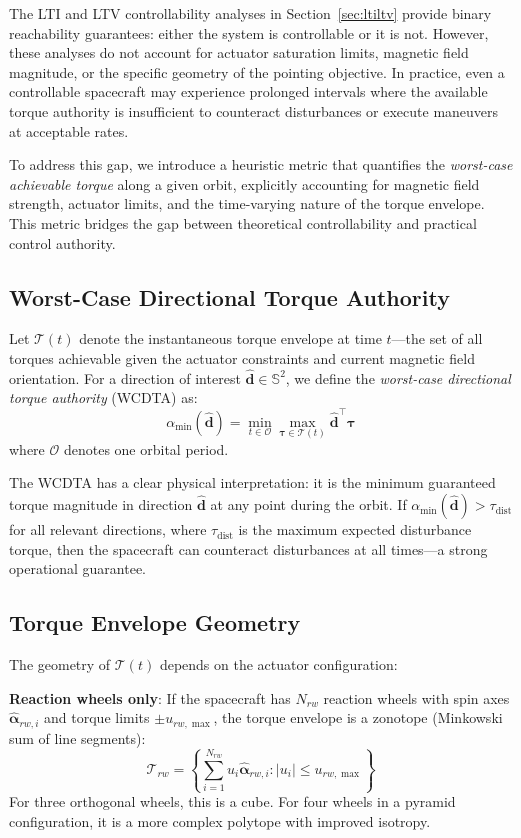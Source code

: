 \documentclass[conference]{IEEEtran}
\begin{document}
The LTI and LTV controllability analyses in Section~\ref{sec:ltiltv} provide binary reachability guarantees: either the system is controllable or it is not. However, these analyses do not account for actuator saturation limits, magnetic field magnitude, or the specific geometry of the pointing objective. In practice, even a controllable spacecraft may experience prolonged intervals where the available torque authority is insufficient to counteract disturbances or execute maneuvers at acceptable rates.

To address this gap, we introduce a heuristic metric that quantifies the \emph{worst-case achievable torque} along a given orbit, explicitly accounting for magnetic field strength, actuator limits, and the time-varying nature of the torque envelope. This metric bridges the gap between theoretical controllability and practical control authority.

\subsection{Worst-Case Directional Torque Authority}
Let $\mathcal{T}(t)$ denote the instantaneous torque envelope at time $t$---the set of all torques achievable given the actuator constraints and current magnetic field orientation. For a direction of interest $\hat{\mathbf{d}} \in \mathbb{S}^2$, we define the \emph{worst-case directional torque authority} (WCDTA) as:
\begin{equation}
    \alpha_{\min}(\hat{\mathbf{d}}) = \min_{t \in \mathcal{O}} \max_{\boldsymbol{\tau} \in \mathcal{T}(t)} \hat{\mathbf{d}}^\top \boldsymbol{\tau}
\end{equation}
where $\mathcal{O}$ denotes one orbital period.

The WCDTA has a clear physical interpretation: it is the minimum guaranteed torque magnitude in direction $\hat{\mathbf{d}}$ at any point during the orbit. If $\alpha_{\min}(\hat{\mathbf{d}}) > \tau_{\text{dist}}$ for all relevant directions, where $\tau_{\text{dist}}$ is the maximum expected disturbance torque, then the spacecraft can counteract disturbances at all times---a strong operational guarantee.

\subsection{Torque Envelope Geometry}
The geometry of $\mathcal{T}(t)$ depends on the actuator configuration:

\textbf{Reaction wheels only}: If the spacecraft has $N_{rw}$ reaction wheels with spin axes $\hat{\boldsymbol{\alpha}}_{rw,i}$ and torque limits $\pm u_{rw,\max}$, the torque envelope is a zonotope (Minkowski sum of line segments):
\begin{equation}
\mathcal{T}_{rw} = \left\{ \sum_{i=1}^{N_{rw}} u_i \hat{\boldsymbol{\alpha}}_{rw,i} : |u_i| \leq u_{rw,\max} \right\}
\end{equation}
For three orthogonal wheels, this is a cube. For four wheels in a pyramid configuration, it is a more complex polytope with improved isotropy.
\end{document}
